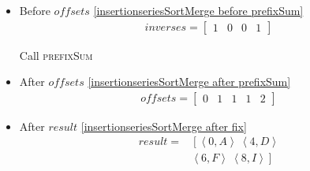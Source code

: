 \begin{frame}[containsverbatim]{\insertionseriesexampleframe}
\begin{columns}[c]
\begin{column}{0.7\textwidth}
\begin{multicols}{2}
\begin{itemize}
                            \item Before $offsets$ \cref{insertionseriesSortMerge before prefixSum}
                            \begin{align*}
                                inverses = \begin{bmatrix}1 & 0 & 0 & 1\end{bmatrix}
                            \end{align*}

                            Call \textsc{prefixSum}

                            \item After $offsets$ \cref{insertionseriesSortMerge after prefixSum}
                            \begin{align*}
                                offsets = \begin{bmatrix}0 & 1 & 1 & 1 & 2\end{bmatrix}
                            \end{align*}

                            \item After $result$ \cref{insertionseriesSortMerge after fix}
                            \begin{align*}
                                result = & \left[\left<0, A\right> \ \left<4, D\right>\right. \\ 
                                & \left.\left<6, F\right> \ \left<8, I\right>\right]
                            \end{align*}
                        \end{itemize}
                    \end{multicols}
                \end{column}
            \end{columns}
        \end{frame}

